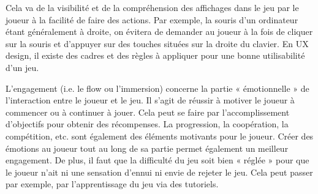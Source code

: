 \documentclass[11pt]{article}
\begin{document}
		Cela va de la visibilité et de la compréhension des affichages dans le jeu par le joueur à la facilité de faire des actions.
		Par exemple, la souris d’un ordinateur étant généralement à droite, on évitera de demander au joueur à la fois de cliquer sur la souris et d’appuyer sur des touches situées sur la droite du clavier.
		En UX design, il existe des cadres et des règles à appliquer pour une bonne utilisabilité d’un jeu.\par
		L’engagement (i.e. le flow ou l’immersion) concerne la partie « émotionnelle » de l’interaction entre le joueur et le jeu.
		Il s’agit de réussir à motiver le joueur à commencer ou à continuer à jouer.
		Cela peut se faire par l’accomplissement d’objectifs pour obtenir des récompenses.
		La progression, la coopération, la compétition, etc. sont également des éléments motivants pour le joueur.
		Créer des émotions au joueur tout au long de sa partie permet également un meilleur engagement.
		De plus, il faut que la difficulté du jeu soit bien « réglée » pour que le joueur n’ait ni une sensation d’ennui ni envie de rejeter le jeu.
		Cela peut passer par exemple, par l’apprentissage du jeu via des tutoriels.
\end{document}
